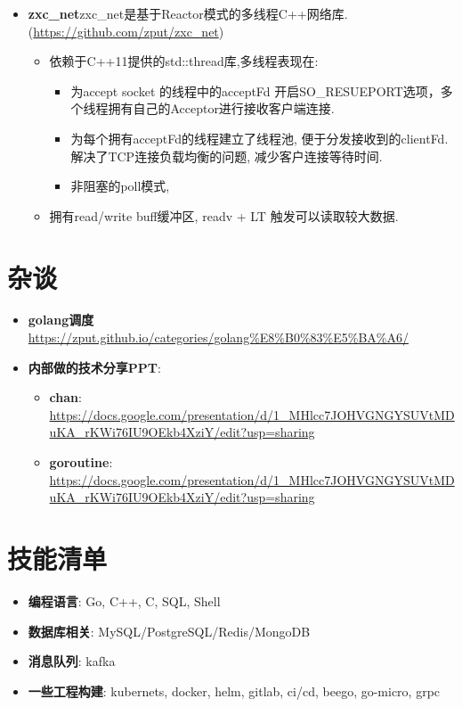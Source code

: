 \documentclass{resume}
\begin{document}
\begin{itemize}[parsep=0.2ex]
  \item \textbf{zxc\_net}zxc\_net是基于Reactor模式的多线程C++网络库.(\url{https://github.com/zput/zxc\_net})
    \begin{itemize}[parsep=0.2ex]
          \item 依赖于C++11提供的std::thread库,多线程表现在:
            \begin{itemize}[parsep=0.2ex]
              \item 为accept socket 的线程中的acceptFd 开启SO\_RESUEPORT选项，多个线程拥有自己的Acceptor进行接收客户端连接.
              \item 为每个拥有acceptFd的线程建立了线程池, 便于分发接收到的clientFd. 解决了TCP连接负载均衡的问题, 减少客户连接等待时间.
              \item 非阻塞的poll模式,
            \end{itemize}
          \item 拥有read/write buff缓冲区, readv + LT 触发可以读取较大数据.
    \end{itemize}
\end{itemize}


\section{杂谈}
\begin{itemize}[parsep=0.2ex]
  \item \textbf{golang调度} \url{https://zput.github.io/categories/golang%E8%B0%83%E5%BA%A6/}
  \item \textbf{内部做的技术分享PPT}:
  \begin{itemize}[parsep=0.2ex]
    \item \textbf{chan}: \url{https://docs.google.com/presentation/d/1_MHlcc7JOHVGNGYSUVtMDuKA_rKWi76IU9OEkb4XziY/edit?usp=sharing}
    \item \textbf{goroutine}: \url{https://docs.google.com/presentation/d/1_MHlcc7JOHVGNGYSUVtMDuKA_rKWi76IU9OEkb4XziY/edit?usp=sharing}
  \end{itemize}
\end{itemize}

\section{技能清单}
\begin{itemize}[parsep=0.2ex]
  \item \textbf{编程语言}: Go, C++, C, SQL, Shell
  \item \textbf{数据库相关}: MySQL/PostgreSQL/Redis/MongoDB
  \item \textbf{消息队列}: kafka
  \item \textbf{一些工程构建}: kubernets, docker, helm, gitlab, ci/cd, beego, go-micro, grpc
\end{itemize}


%
%
\end{document}
